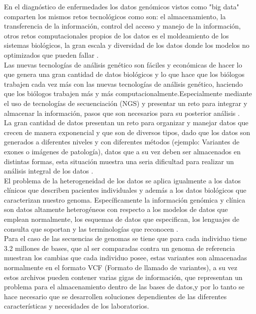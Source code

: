 {En el diagnóstico de enfermedades los datos genómicos vistos como "big data" comparten los mismos retos tecnológicos como son: el almacenamiento, la transferencia de la información, control del acceso y manejo de la información, otros retos computacionales propios de los datos es el moldeamiento de los sistemas biológicos, la gran escala y diversidad de los datos donde los modelos no optimizados que pueden fallar \cite{Ren2015}. \\

Las nuevas tecnologías de análisis genético son fáciles y económicas de hacer lo que genera una gran cantidad de datos biológicos y lo que hace que los biólogos trabajen cada vez más con las nuevas tecnologías de análisis genético, haciendo que los biólogos trabajen más y más computacionalmente.Especialmente mediante el uso de  tecnologías de secuenciación (NGS) y presentar un reto para integrar y almacenar la información, pasos que son necesarios para su posterior análisis \cite{Li2014,Cook2016}.\\

La gran cantidad de datos presentan un reto para organizar y manejar datos que crecen de manera exponencial y que son de diversos tipos, dado que los datos son generados a diferentes niveles y con diferentes métodos (ejemplo: Variantes de exones o imágenes de patología), datos que a su vez deben ser almacenados en distintas formas, esta situación muestra una seria dificultad para realizar un análisis integral de los datos \cite{Cook2016,Li2014}.\\

El problema de la heterogeneidad  de los datos  se aplica igualmente a los datos clínicos que describen pacientes individuales y además a los datos biológicos que caracterizan nuestro genoma. Específicamente la información genómica y clínica son datos altamente heterogéneos con respecto a los modelos de datos que emplean normalmente, los esquemas de datos que especifican, los lenguajes de consulta que soportan y las terminologías que reconocen \cite{Sujansky2001}.\\

Para el caso de las secuencias de genomas se tiene que para cada individuo tiene 3.2 millones de bases, que al ser comparadas contra un genoma de referencia muestran los cambias que cada individuo posee, estas variantes son almacenadas normalmente en el formato VCF (Formato de llamado de variantes), a su vez estos archivos pueden contener varias gigas de información, que representan un problema para el almacenamiento dentro de las bases de datos,y por lo tanto se hace necesario que se desarrollen soluciones dependientes de las diferentes características y necesidades de los laboratorios\cite{Kutzera2017}.\\

}

